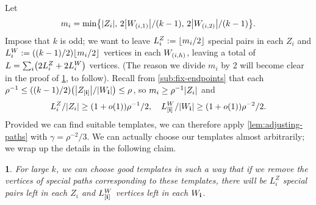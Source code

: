 \documentclass[11pt,english]{article}
\theoremstyle{plain}
\theoremstyle{plain}
\theoremstyle{plain}
\theoremstyle{plain}
\theoremstyle{plain}
\theoremstyle{definition}
\theoremstyle{definition}
\theoremstyle{remark}
\theoremstyle{remark}
\newtheorem{claim}[thm]{\protect\claimname}
\theoremstyle{plain}
\theoremstyle{definition}
\theoremstyle{definition}
\theoremstyle{plain}
\theoremstyle{plain}
\theoremstyle{plain}
\theoremstyle{plain}
\theoremstyle{remark}
\theoremstyle{plain}
\newtheorem{myclaim}[mythm]{\protect\claimname}
\renewenvironment{claim}{\begin{myclaim}}{\end{myclaim}}
\theoremstyle{definition}
\let\originalleft\left
\let\originalright\right
\renewcommand{\left}{\mathopen{}\mathclose\bgroup\originalleft}
\renewcommand{\right}{\aftergroup\egroup\originalright}
\providecommand{\claimname}{Claim}
\begin{document}
Let
\[
m_{i}=\min\left\{ \left|Z_{i}\right|,\,2\left|W_{\left(i,1\right)}\right|/\left(k-1\right),\,2\left|W_{\left(i,2\right)}\right|/\left(k-1\right)\right\} .
\]
Impose that $k$ is odd; we want to leave $L_{i}^{Z}:=\floor{m_{i}/2}$
special pairs in each $Z_{i}$ and $L_{i}^{W}:=\left(\left(k-1\right)/2\right)\floor{m_{i}/2}$
vertices in each $W_{\left(i,h\right)}$, leaving a total of $L=\sum_{i}\left(2L_{i}^{Z}+2L_{i}^{W}\right)$
vertices. (The reason we divide $m_{i}$ by 2 will become clear in
the proof of \ref{claim:find-templates}, to follow). Recall from
\ref{sub:fix-endpoints} that each $\rho^{-1}\le\left(\left(k-1\right)/2\right)\left(\left|Z_{\left[\bi\right]}\right|/\left|W_{\bi}\right|\right)\le\rho$,
so $m_{i}\ge\rho^{-1}\left|Z_{i}\right|$ and 
\[
L_{i}^{Z}/\left|Z_{i}\right|\ge\left(1+o\left(1\right)\right)\rho^{-1}/2,\quad L_{\left[\bi\right]}^{W}/\left|W_{\bi}\right|\ge\left(1+o\left(1\right)\right)\rho^{-2}/2.
\]
Provided we can find suitable templates, we can therefore apply \ref{lem:adjusting-paths}
with $\gamma=\rho^{-2}/3$. We can actually choose our templates almost
arbitrarily; we wrap up the details in the following claim.
\begin{claim}
\label{claim:find-templates}For large $k$, we can choose good templates
in such a way that if we remove the vertices of special paths corresponding
to these templates, there will be $L_{i}^{Z}$ special pairs left
in each $Z_{i}$ and $L_{\left[\bi\right]}^{W}$ vertices left in
each $W_{\mathbf{i}}$.\end{claim}
\end{document}
